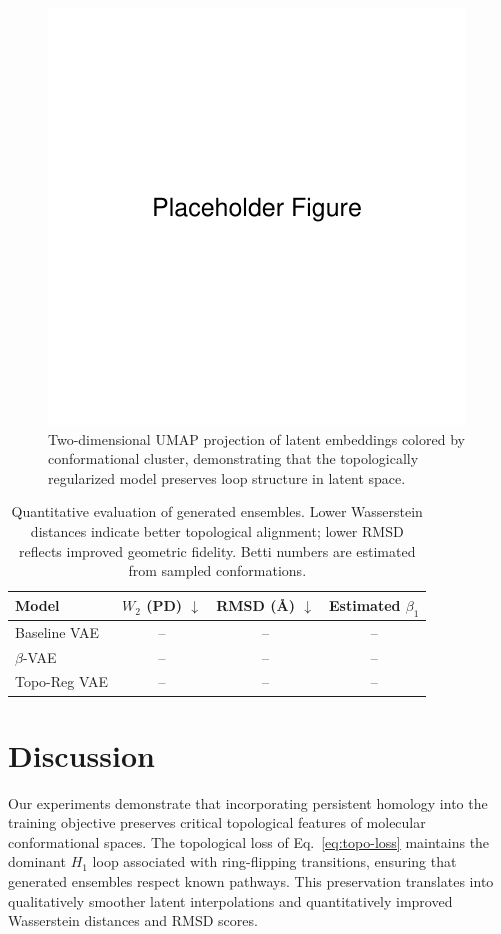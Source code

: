 \documentclass[11pt]{article}
\begin{document}
\begin{figure}[t]
    \centering
    \includegraphics[width=0.75\linewidth]{figures/placeholder.pdf}
    \caption{Two-dimensional UMAP projection of latent embeddings colored by conformational cluster, demonstrating that the topologically regularized model preserves loop structure in latent space.}
    \label{fig:latent_umap}
\end{figure}

\begin{table}[t]
    \centering
    \caption{Quantitative evaluation of generated ensembles. Lower Wasserstein distances indicate better topological alignment; lower RMSD reflects improved geometric fidelity. Betti numbers are estimated from sampled conformations.}
    \label{tab:results}
    \begin{tabular}{lccc}
        \toprule
        Model & $W_2$ (PD) $\downarrow$ & RMSD (\AA) $\downarrow$ & Estimated $\beta_1$ \\
        \midrule
        Baseline VAE & -- & -- & -- \\
        $\beta$-VAE & -- & -- & -- \\
        Topo-Reg VAE & -- & -- & -- \\
        \bottomrule
    \end{tabular}
\end{table}

\section{Discussion}
Our experiments demonstrate that incorporating persistent homology into the training objective preserves critical topological features of molecular conformational spaces. The topological loss of Eq.~\eqref{eq:topo-loss} maintains the dominant $H_1$ loop associated with ring-flipping transitions, ensuring that generated ensembles respect known pathways. This preservation translates into qualitatively smoother latent interpolations and quantitatively improved Wasserstein distances and RMSD scores.
\end{document}
